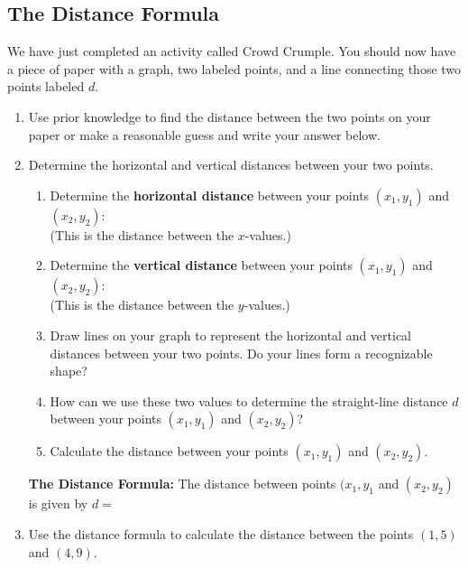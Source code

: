 \newpage


\subsection{The Distance Formula}
\noindent We have just completed an activity called Crowd Crumple.  You should now have a piece of paper with a graph, two labeled points, and a line connecting those two points labeled $d$.
\begin{enumerate}
\item Use prior knowledge to find the distance between the two points on your paper or make a reasonable guess and write your answer below.\\[.5in]

\item Determine the horizontal and vertical distances between your two points.
\begin{enumerate}
\item Determine the \textbf{horizontal distance} between your points $(x_1,y_1)$ and $(x_2,y_2)$:\\
(This is the distance between the $x$-values.)\\[.5in]
\item Determine the \textbf{vertical distance} between your points $(x_1,y_1)$ and $(x_2,y_2)$:\\
(This is the distance between the $y$-values.)\\[.5in]
\item Draw lines on your graph to represent the horizontal and vertical distances between your two points.  Do your lines form a recognizable shape?\\[.5in]
\item How can we use these two values to determine the straight-line distance $d$ between your points $(x_1,y_1)$ and $(x_2,y_2)$?\\[.5in]
\item Calculate the distance between your points $(x_1,y_1)$ and $(x_2,y_2)$.

\end{enumerate}
\vfill


\newpage


\noindent \textbf{The Distance Formula:}  The distance between points $(x_1,y_1$ and $(x_2,y_2)$ is given by $d=$

\vfill
\item Use the distance formula to calculate the distance between the points $(1,5)$ and $(4,9)$.
\end{enumerate}
\vfill
\vfill
\vfill
